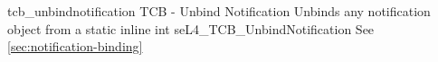 %
%
%
%

\apidoc
{tcb_unbindnotification}
{TCB - Unbind Notification}
{Unbinds any notification object from a }
{static inline int seL4\_TCB\_UnbindNotification}
{
}
{\errorenumdesc}
{See \autoref{sec:notification-binding}}

